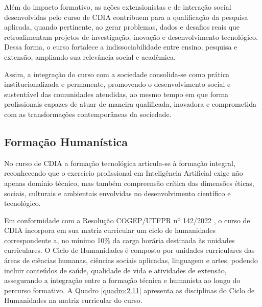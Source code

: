 Além do impacto formativo, as ações extensionistas e de interação social desenvolvidas pelo curso de CDIA contribuem para a qualificação da pesquisa aplicada, quando pertinente, ao gerar problemas, dados e desafios reais que retroalimentam projetos de investigação, inovação e desenvolvimento tecnológico. Dessa forma, o curso fortalece a indissociabilidade entre ensino, pesquisa e extensão, ampliando sua relevância social e acadêmica.

Assim, a integração do curso com a sociedade consolida-se como prática institucionalizada e permanente, promovendo o desenvolvimento social e sustentável das comunidades atendidas, ao mesmo tempo em que forma profissionais capazes de atuar de maneira qualificada, inovadora e comprometida com as transformações contemporâneas da sociedade.

\subsection{Formação Humanística}

No curso de CDIA a formação tecnológica articula-se à formação integral, reconhecendo que o exercício profissional em Inteligência Artificial exige não apenas domínio técnico, mas também compreensão crítica das dimensões éticas, sociais, culturais e ambientais envolvidas no desenvolvimento científico e tecnológico.

Em conformidade com a Resolução COGEP/UTFPR nº 142/2022 \cite{UTFPR_DC_2022}, o curso de CDIA incorpora em sua matriz curricular um ciclo de humanidades correspondente a, no mínimo 10\% da carga horária destinada às unidades curriculares. O Ciclo de Humanidades é composto por unidades curriculares das áreas de ciências humanas, ciências sociais aplicadas, linguagem e artes, podendo incluir conteúdos de saúde, qualidade de vida e atividades de extensão, assegurando a integração entre a formação técnica e humanista ao longo do percurso formativo. A Quadro \ref{quadro:2.11} apresenta as disciplinas do Ciclo de Humanidades na matriz curricular do curso.


